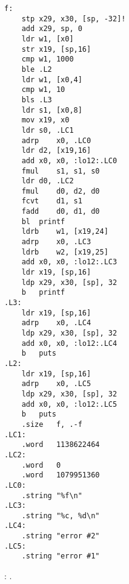 \begin{lstlisting}[caption=\Optimizing GCC 4.9 (ARM64)]
f:
	stp	x29, x30, [sp, -32]!
	add	x29, sp, 0
	ldr	w1, [x0]
	str	x19, [sp,16]
	cmp	w1, 1000
	ble	.L2
	ldr	w1, [x0,4]
	cmp	w1, 10
	bls	.L3
	ldr	s1, [x0,8]
	mov	x19, x0
	ldr	s0, .LC1
	adrp	x0, .LC0
	ldr	d2, [x19,16]
	add	x0, x0, :lo12:.LC0
	fmul	s1, s1, s0
	ldr	d0, .LC2
	fmul	d0, d2, d0
	fcvt	d1, s1
	fadd	d0, d1, d0
	bl	printf
	ldrb	w1, [x19,24]
	adrp	x0, .LC3
	ldrb	w2, [x19,25]
	add	x0, x0, :lo12:.LC3
	ldr	x19, [sp,16]
	ldp	x29, x30, [sp], 32
	b	printf
.L3:
	ldr	x19, [sp,16]
	adrp	x0, .LC4
	ldp	x29, x30, [sp], 32
	add	x0, x0, :lo12:.LC4
	b	puts
.L2:
	ldr	x19, [sp,16]
	adrp	x0, .LC5
	ldp	x29, x30, [sp], 32
	add	x0, x0, :lo12:.LC5
	b	puts
	.size	f, .-f
.LC1:
	.word	1138622464
.LC2:
	.word	0
	.word	1079951360
.LC0:
	.string	"%f\n"
.LC3:
	.string	"%c, %d\n"
.LC4:
	.string	"error #2"
.LC5:
	.string	"error #1"
\end{lstlisting}



\Answer{}: .
